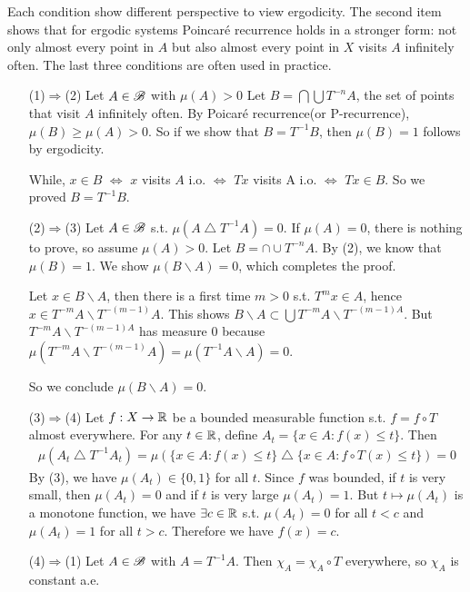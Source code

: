 \documentclass[10pt,a4paper]{report}
\newenvironment{proof}
{\begin{changemargin}{1cm}{0.5cm} 
	}%
	{\end{changemargin}
}
\begin{document}
Each condition show different perspective to view ergodicity. The second item shows that for ergodic systems Poincar\'{e} recurrence holds in a stronger form: not only almost every point in $A$ but also almost every point in $X$ visits $A$ infinitely often. The last three conditions are often used in practice.
\begin{proof}
\pf \begin{itemize}
\item[(1)$\Rightarrow$(2)] Let $A\in \mathscr{B}$ with $\mu(A) >0$ Let $B = \bigcap \bigcup T^{-n}A$, the set of points that visit $A$ infinitely often. By Poicar\'{e} recurrence(or P-recurrence), $\mu(B) \geq \mu(A) >0$. So if we show that $B = T^{-1}B$, then $\mu(B)=1$ follows by ergodicity.

\quad While, $x\in B$ $\Leftrightarrow$ $x$ visits $A$ i.o. $\Leftrightarrow$ $Tx$ visits A i.o. $\Leftrightarrow$ $Tx \in B$. So we proved $B = T^{-1}B$.
\item[(2)$\Rightarrow$(3)] Let $A\in \mathscr{B}$ s.t. $\mu(A \bigtriangleup T^{-1} A) =0$. If $\mu(A) =0$, there is nothing to prove, so assume $\mu(A)>0$. Let $B= \cap \cup T^{-n} A$. By (2), we know that $\mu(B) = 1$. We show $\mu(B\backslash A) =0$, which completes the proof.

\quad Let $x\in B\backslash A$, then there is a first time $m>0$ s.t. $T^m x\in A$, hence $x\in T^{-m}A \backslash T^{-(m-1)}A$. This shows $B\backslash A \subset \bigcup T^{-m} A \backslash T^{-(m-1)A}$. But $T^{-m} A \backslash T^{-(m-1)A}$ has measure 0 because $\mu(T^{-m} A \backslash T^{-(m-1)}A)= \mu(T^{-1}A\backslash A) =0$.

\quad So we conclude $\mu(B\backslash A) =0$.
\item[(3)$\Rightarrow$(4)] Let $f:X\rightarrow \mathbb{R}$ be a bounded measurable function s.t. $f= f\circ T$ almost everywhere. For any $t\in \mathbb{R}$, define $A_t = \{x\in A : f(x) \leq t\}$. Then
\begin{align*}
\mu(A_t \bigtriangleup T^{-1}A_t) = \mu( \{x\in A : f(x) \leq t\} \bigtriangleup \{x\in A : f \circ T(x) \leq t\}) =0
\end{align*} 
By (3), we have $\mu(A_t)\in \{0,1\}$ for all $t$. Since $f$ was bounded, if $t$ is very small, then $\mu(A_t)=0$ and if $t$ is very large $\mu(A_t) =1$. But $t\mapsto \mu(A_t)$ is a monotone function, we have $\exists c \in \mathbb{R}$ s.t. $\mu(A_t) =0$ for all $t<c$ and $\mu(A_t) =1$ for all $t>c$. Therefore we have $f(x)=c$.
\item[(4)$\Rightarrow$(1)] Let $A\in \mathscr{B}$ with $A = T^{-1}A$. Then $\chi_A = \chi_A \circ T$ everywhere, so $\chi_A$ is constant a.e.
\end{itemize}
\end{proof}
\s
\end{document}
